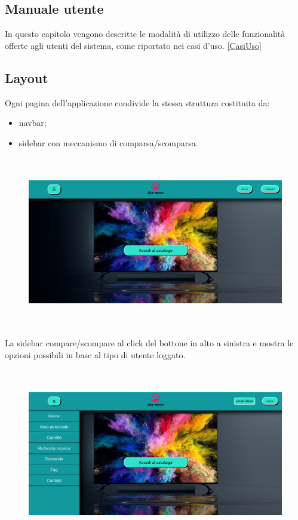 \documentclass[a4paper, 14pt]{article}
\begin{document}
\begin{flushleft}
	
	\section{Manuale utente}
		\graphicspath{{"./img/"}}
		In questo capitolo vengono descritte le modalità di utilizzo delle funzionalità offerte agli utenti del sistema, come riportato nei casi d'uso. \ref{CasiUso}
			\subsection{Layout}
				Ogni pagina dell'applicazione condivide la stessa struttura costituita da:
				\begin{itemize}
					\item navbar;
					\item sidebar con meccanismo di comparsa/scomparsa.
				\end{itemize}
				\begin{figure}[H]
					\centering
					\includegraphics[height=7.5cm, frame=2pt]{"screenHomepage.png"}
				\end{figure}
				La sidebar compare/scompare al click del bottone in alto a sinistra e mostra le opzioni possibili
				in base al tipo di utente loggato.
				\begin{figure}[H]
					\centering
					\includegraphics[height=7.5cm, frame=2pt]{"screenHomepageCliente.png"}
				\end{figure}
				

\end{flushleft}
\end{document}
